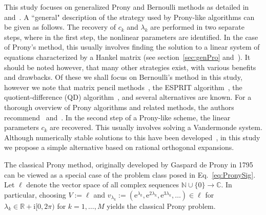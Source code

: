 \documentclass{arxiv}
\newcommand{\e}{\mathrm{e}}
\newcommand{\ri}{\mathrm{i}}
\begin{document}
This study focuses on generalized Prony and Bernoulli methods as detailed in~\cite{siamdozsa} and~\cite{SS1}. A ``general" description of the strategy used by Prony-like algorithms can be given as follows. The recovery of $c_k$ and $\lambda_k$ are performed in two separate steps, where in the first step, the nonlinear parameters are identified. In the case of Prony's method, this usually involves finding the solution to a linear system of equations characterized by a Hankel matrix (see section~\ref{sec:genPro} and~\cite{peter2013generalizedDissertation, stampfer2019generalized}). It should be noted however, that many other strategies exist, with various benefits and drawbacks. Of these we shall focus on Bernoulli's method in this study, however we note that matrix pencil methods~\cite{ikramov1993matrix}, the ESPRIT algorithm~\cite{roy1986estimation}, the quotient-difference (QD) algorithm~\cite{tsypin2020application}, and several alternatives are known. For a thorough overview of Prony algorithms and related methods, the authors recommend~\cite{peter2013generalized} and~\cite{stampfer2019generalized}. In the second step of a Prony-like scheme, the linear parameters $c_k$ are recovered. This usually involves solving a Vandermonde system. Although numerically stable solutions to this have been developed~\cite{higham1988fast}, in this study we propose a simple alternative based on rational orthogonal expansions.

The classical Prony method, originally developed by Gaspard de Prony in 1795~\cite{prony1795} can be viewed as a special case of the problem class posed in Eq.~\eqref{eq:PronySig}. Let $\ell$ denote the vector space of all complex sequences $\mathbb{N} \cup \{0\} \to \mathbb{C}$. In particular, choosing $V := \ell$ and $v_{\lambda_k} := \left( \e^{\lambda_k}, \e^{2 \lambda_k}, \e^{3 \lambda_k}, \ldots \right) \in \ell$ for $\lambda_k \in \mathbb{R} + \ri[0, 2\pi)$ for $k=1,\ldots,M$ yields the classical Prony problem.
\end{document}
